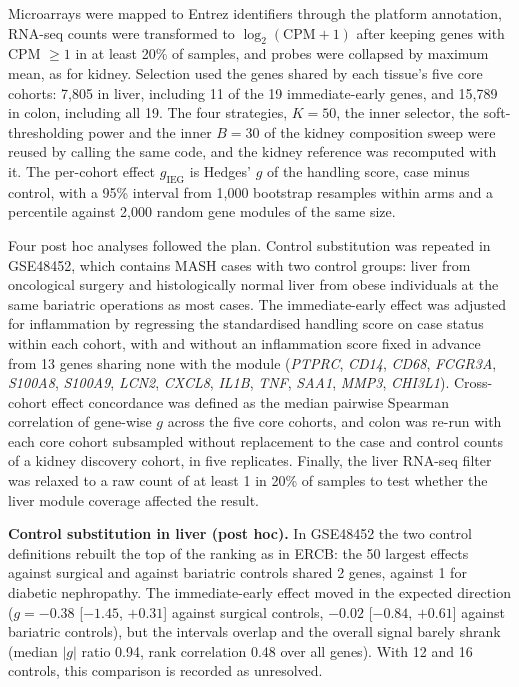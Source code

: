 \documentclass[11pt]{article}
\begin{document}
Microarrays were mapped to Entrez identifiers through the platform annotation, RNA-seq counts
were transformed to $\log_2(\text{CPM}+1)$ after keeping genes with CPM $\ge 1$ in at least
20\% of samples, and probes were collapsed by maximum mean, as for kidney. Selection used the
genes shared by each tissue's five core cohorts: 7,805 in liver, including 11 of the 19
immediate-early genes, and 15,789 in colon, including all 19. The four strategies, $K = 50$, the
inner selector, the soft-thresholding power and the inner $B = 30$ of the kidney composition
sweep were reused by calling the same code, and the kidney reference was recomputed with it. The
per-cohort effect $g_{\text{IEG}}$ is Hedges' $g$ of the handling score, case minus control,
with a 95\% interval from 1,000 bootstrap resamples within arms and a percentile against 2,000
random gene modules of the same size.

Four post hoc analyses followed the plan. Control substitution was repeated in GSE48452, which
contains MASH cases with two control groups: liver from oncological surgery and histologically
normal liver from obese individuals at the same bariatric operations as most cases. The
immediate-early effect was adjusted for inflammation by regressing the standardised handling
score on case status within each cohort, with and without an inflammation score fixed in advance
from 13 genes sharing none with the module (\textit{PTPRC}, \textit{CD14}, \textit{CD68},
\textit{FCGR3A}, \textit{S100A8}, \textit{S100A9}, \textit{LCN2}, \textit{CXCL8}, \textit{IL1B},
\textit{TNF}, \textit{SAA1}, \textit{MMP3}, \textit{CHI3L1}). Cross-cohort effect concordance
was defined as the median pairwise Spearman correlation of gene-wise $g$ across the five core
cohorts, and colon was re-run with each core cohort subsampled without replacement to the case and
control counts of a kidney discovery cohort, in five replicates. Finally, the liver RNA-seq filter
was relaxed to a raw count of at least 1 in 20\% of samples to test whether the liver module
coverage affected the result.


\textbf{Control substitution in liver (post hoc).} In GSE48452 the two control definitions
rebuilt the top of the ranking as in ERCB: the 50 largest effects against surgical and against
bariatric controls shared 2 genes, against 1 for diabetic nephropathy. The immediate-early
effect moved in the expected direction ($g = -0.38$ [$-1.45$, $+0.31$] against surgical
controls, $-0.02$ [$-0.84$, $+0.61$] against bariatric controls), but the intervals overlap and
the overall signal barely shrank (median $|g|$ ratio 0.94, rank correlation 0.48 over all
genes). With 12 and 16 controls, this comparison is recorded as unresolved.
\end{document}
